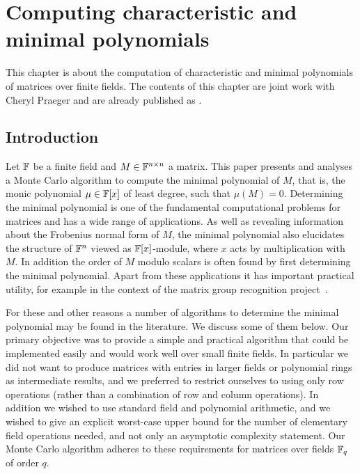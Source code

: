 
\chapter{Computing characteristic and minimal polynomials}
\label{chap:charminpoly}

This chapter is about the computation of characteristic and minimal
polynomials of matrices over finite fields. The contents of this
chapter are joint work with Cheryl
Praeger and are already published as \cite{minpolypaper}.

\section{Introduction}

Let $\mathbb{F}$ be a finite field and $M \in \mathbb{F}^{n \times n}$ a matrix. This paper
presents and analyses a Monte Carlo  algorithm to compute the minimal 
polynomial of $M$, that is,
the monic polynomial $\mu \in \mathbb{F}[x]$ of least degree, such that
$\mu(M) = 0$. 
Determining the minimal polynomial is one of the fundamental computational
problems for matrices and has a wide range of applications. As well as 
revealing information about the Frobenius
normal form of $M$, the minimal polynomial also elucidates the structure 
of $\mathbb{F}^n$ viewed as $\mathbb{F}[x]$-module, where $x$ acts by multiplication with $M$. 
In addition the order of $M$ modulo scalars is often found by first 
determining the minimal polynomial. Apart from these applications it has
important practical utility, for example
in the context of the matrix group recognition project~\cite{OB}.

For these and other reasons a number of algorithms to determine the 
minimal polynomial may be found in the literature. We discuss some 
of them below. Our primary objective 
was to provide a simple and practical algorithm that could be 
implemented easily and would work well over small finite fields. In
particular we did not want to produce matrices with entries in 
larger fields or polynomial rings as intermediate results, 
and we preferred to restrict ourselves to using only row operations 
(rather than a combination of row and column operations). 
In addition we wished to use standard field and polynomial arithmetic,
and we wished to give  an explicit worst-case upper bound
for the number of elementary field operations needed, and not only an
asymptotic complexity statement.
Our Monte Carlo algorithm adheres to these requirements for matrices 
over fields $\mathbb{F}_q$ of order $q$.

